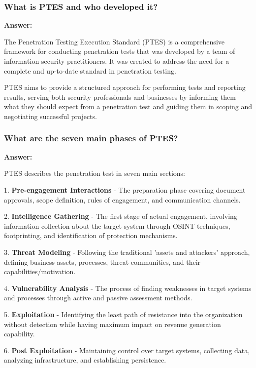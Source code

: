 \documentclass[12pt,a4paper]{article}
\begin{document}
\subsubsection{What is PTES and who developed it?}

\textbf{Answer:}

The Penetration Testing Execution Standard (PTES) is a comprehensive framework for conducting penetration tests that was developed by a team of information security practitioners.  It was created to address the need for a complete and up-to-date standard in penetration testing. 

PTES aims to provide a structured approach for performing tests and reporting results, serving both security professionals and businesses by informing them what they should expect from a penetration test and guiding them in scoping and negotiating successful projects. 

\subsubsection{What are the seven main phases of PTES?}

\textbf{Answer:}

PTES describes the penetration test in seven main sections: 

1. \textbf{Pre-engagement Interactions} - The preparation phase covering document approvals, scope definition, rules of engagement, and communication channels.

2. \textbf{Intelligence Gathering} - The first stage of actual engagement, involving information collection about the target system through OSINT techniques, footprinting, and identification of protection mechanisms.

3. \textbf{Threat Modeling} - Following the traditional 'assets and attackers' approach, defining business assets, processes, threat communities, and their capabilities/motivation.

4. \textbf{Vulnerability Analysis} - The process of finding weaknesses in target systems and processes through active and passive assessment methods.

5. \textbf{Exploitation} - Identifying the least path of resistance into the organization without detection while having maximum impact on revenue generation capability.

6. \textbf{Post Exploitation} - Maintaining control over target systems, collecting data, analyzing infrastructure, and establishing persistence.
\end{document}
